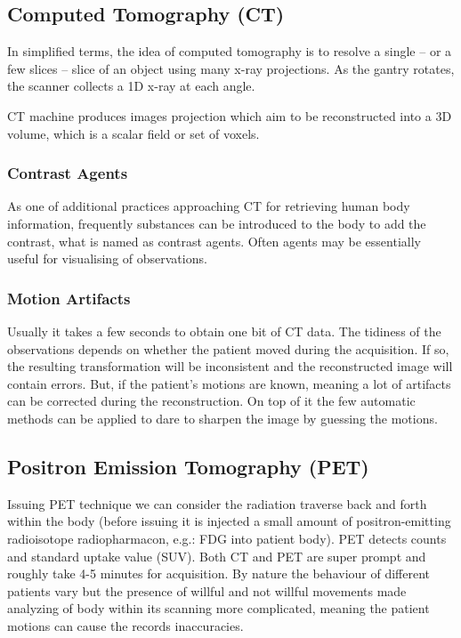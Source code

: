 \subsection{Computed Tomography (CT)}
In simplified terms, the idea of computed tomography is to resolve a single -- or a few slices -- slice of an object using many x-ray projections. As the gantry rotates, the scanner collects a 1D x-ray at each angle.

CT machine produces images projection which aim to be reconstructed into a 3D volume, which is a scalar field or set of voxels. 

\subsubsection{Contrast Agents}
As one of additional practices approaching CT for retrieving human body information, frequently substances can be introduced to the body to add the contrast, what is named as contrast agents. Often agents may be essentially useful for visualising of observations.          

\subsubsection{Motion Artifacts}
Usually it takes a few seconds to obtain one bit of CT data. The tidiness of the observations depends on whether the patient moved during the acquisition. If so, the resulting transformation will be inconsistent and the reconstructed image will contain errors. But, if the patient's motions are known, meaning a lot of artifacts can be corrected during the reconstruction. On top of it the few automatic methods can be applied to dare to sharpen the image by guessing the motions.

\subsection{Positron Emission Tomography (PET)}
Issuing PET technique we can consider the radiation traverse back and forth within the body (before issuing it is injected a small amount of positron-emitting radioisotope radiopharmacon, e.g.: FDG into patient body). PET detects counts and standard uptake value (SUV). Both CT and PET are super prompt and roughly take 4-5 minutes for acquisition.  
By nature the behaviour of different patients vary but the presence of willful and not willful movements made analyzing of body within its scanning more complicated, meaning the patient motions can cause the records inaccuracies. 

